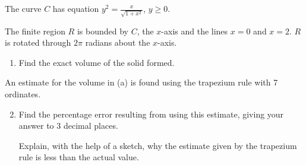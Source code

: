 \begin{problem}
    The curve $C$ has equation $y^2 = \frac{x}{\sqrt{1 + x^2}}$, $y \geq 0$.

    The finite region $R$ is bounded by $C$, the $x$-axis and the lines $x = 0$ and $x = 2$. $R$ is rotated through $2\pi$ radians about the $x$-axis.

    \begin{enumerate}
        \item Find the exact volume of the solid formed.
    \end{enumerate}

    An estimate for the volume in (a) is found using the trapezium rule with 7 ordinates.

    \begin{enumerate}
        \setcounter{enumi}{1}
        \item Find the percentage error resulting from using this estimate, giving your answer to 3 decimal places.

        Explain, with the help of a sketch, why the estimate given by the trapezium rule is less than the actual value.
    \end{enumerate}
\end{problem}
\clearpage
